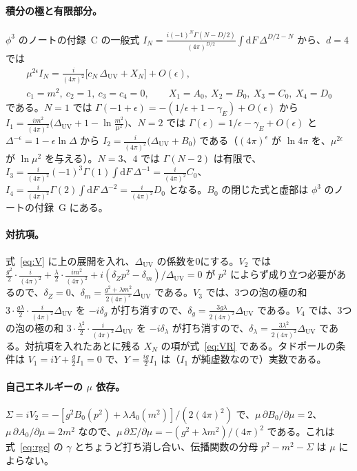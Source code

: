 \documentclass[a4paper,10pt]{ltjsarticle}
\newcommand{\dd}{\mathrm{d}}
\begin{document}
\paragraph{積分の極と有限部分。}$\phi^3$ のノートの付録~C の一般式 $I_N=\frac{i(-1)^N\Gamma(N-D/2)}{(4\pi)^{D/2}}\int\dd F\,\Delta^{D/2-N}$ から、$d=4$ では
\begin{gather*}
\mu^{2\epsilon}I_N=\frac{i}{(4\pi)^2}\bigl[c_N\,\Delta_{\mathrm{UV}}+X_N\bigr]+O(\epsilon),\\
c_1=m^2,\ c_2=1,\ c_3=c_4=0,\qquad X_1=A_0,\ X_2=B_0,\ X_3=C_0,\ X_4=D_0
\end{gather*}
である。$N=1$ では $\Gamma(-1+\epsilon)=-(1/\epsilon+1-\gamma_E)+O(\epsilon)$ から $I_1=\frac{im^2}{(4\pi)^2}\bigl(\Delta_{\mathrm{UV}}+1-\ln\frac{m^2}{\mu^2}\bigr)$、$N=2$ では $\Gamma(\epsilon)=1/\epsilon-\gamma_E+O(\epsilon)$ と $\Delta^{-\epsilon}=1-\epsilon\ln\Delta$ から $I_2=\frac{i}{(4\pi)^2}\bigl(\Delta_{\mathrm{UV}}+B_0\bigr)$ である（$(4\pi)^\epsilon$ が $\ln4\pi$ を、$\mu^{2\epsilon}$ が $\ln\mu^2$ を与える）。$N=3$、$4$ では $\Gamma(N-2)$ は有限で、$I_3=\frac{i}{(4\pi)^2}(-1)^3\Gamma(1)\int\dd F\,\Delta^{-1}=\frac{i}{(4\pi)^2}C_0$、$I_4=\frac{i}{(4\pi)^2}\Gamma(2)\int\dd F\,\Delta^{-2}=\frac{i}{(4\pi)^2}D_0$ となる。$B_0$ の閉じた式と虚部は $\phi^3$ のノートの付録~G にある。

\paragraph{対抗項。}式~\eqref{eq:V} に上の展開を入れ、$\Delta_{\mathrm{UV}}$ の係数を0にする。$V_2$ では $\frac{g^2}{2}\cdot\frac{i}{(4\pi)^2}+\frac\lambda2\cdot\frac{im^2}{(4\pi)^2}+i(\delta_Zp^2-\delta_m)/\Delta_{\mathrm{UV}}=0$ が $p^2$ によらず成り立つ必要があるので、$\delta_Z=0$、$\delta_m=\frac{g^2+\lambda m^2}{2(4\pi)^2}\Delta_{\mathrm{UV}}$ である。$V_3$ では、3つの泡の極の和 $3\cdot\frac{g\lambda}{2}\cdot\frac{i}{(4\pi)^2}\Delta_{\mathrm{UV}}$ を $-i\delta_g$ が打ち消すので、$\delta_g=\frac{3g\lambda}{2(4\pi)^2}\Delta_{\mathrm{UV}}$ である。$V_4$ では、3つの泡の極の和 $3\cdot\frac{\lambda^2}{2}\cdot\frac{i}{(4\pi)^2}\Delta_{\mathrm{UV}}$ を $-i\delta_\lambda$ が打ち消すので、$\delta_\lambda=\frac{3\lambda^2}{2(4\pi)^2}\Delta_{\mathrm{UV}}$ である。対抗項を入れたあとに残る $X_N$ の項が式~\eqref{eq:VR} である。タドポールの条件は $V_1=iY+\frac g2I_1=0$ で、$Y=\frac{ig}{2}I_1$ は（$I_1$ が純虚数なので）実数である。

\paragraph{自己エネルギーの $\mu$ 依存。}$\Sigma=iV_2=-[g^2B_0(p^2)+\lambda A_0(m^2)]/(2(4\pi)^2)$ で、$\mu\,\partial B_0/\partial\mu=2$、$\mu\,\partial A_0/\partial\mu=2m^2$ なので、$\mu\,\partial\Sigma/\partial\mu=-(g^2+\lambda m^2)/(4\pi)^2$ である。これは式~\eqref{eq:rge} の $\gamma$ とちょうど打ち消し合い、伝播関数の分母 $p^2-m^2-\Sigma$ は $\mu$ によらない。
\end{document}
